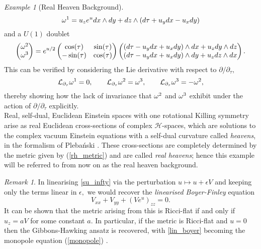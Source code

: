 \documentclass[a4paper,12pt, onecolumn, notitlepage]{article}
\theoremstyle{definition}
\theoremstyle{remark}
\newtheorem{rmk}[thm]{Remark}
\newtheorem{ex}[thm]{Example}
\newcommand{\w}{\omega}
\newcommand{\e}{\epsilon}
\begin{document}
\begin{ex}[Real Heaven Background]
	\begin{equation}
	\label{su_k1}
		\w\indices{^1} = u_{z}e^{u}dx\wedge dy + dz \wedge (d\tau + u_{y}dx - u_{x}dy)
	\end{equation}
	and a $U(1)$ doublet \cite{bakas_1995}
	\begin{equation}
	\label{su_k23}
		\begin{pmatrix}
		\w\indices{^2}\\
		\w\indices{^3}
		\end{pmatrix}
		=
		e^{u/2}
		\begin{pmatrix}
		\cos(\tau) & \sin(\tau) \\
		-\sin(\tau) & \cos(\tau)
		\end{pmatrix}
		\begin{pmatrix}
		(d\tau - u_{y}dx+u_{x}dy)\wedge dx + u_{z}dy\wedge dz\\
		(d\tau - u_{y}dx+u_{x}dy) \wedge dy + u_{z}dz\wedge dx
		\end{pmatrix}.
	\end{equation}
	This can be verified by considering the Lie derivative with respect to $\partial/\partial_{\tau},$
	\begin{equation*}
		\mathcal{L}_{\partial_{\tau}}\w\indices{^1}=0,\qquad \mathcal{L}_{\partial_{\tau}}\w\indices{^2}=\w\indices{^3},\qquad
		\mathcal{L}_{\partial_{\tau}}\w\indices{^3}= -\w\indices{^2},
	\end{equation*}
	thereby showing how the lack of invariance that $\w\indices{^2}$ and $\w\indices{^3}$ exhibit under the action of $\partial/\partial_{\tau}$ explicitly.\\
	Real, self-dual, Euclidean Einstein spaces with one rotational Killing symmetry arise as real Euclidean cross-sections of complex $\mathcal{H}$-spaces, which are solutions to the complex vacuum Einstein equations with a self-dual curvature called \emph{heavens}, in the formalism of Pleba\'nski \cite{plebanski_1975,park_1990}. These cross-sections are completely determined by the metric given by (\ref{rh_metric}) and are called \emph{real heavens}; hence this example will be referred to from now on as the real heaven background.\\
\end{ex}

\begin{rmk}
	In linearising \cref{su_infty} via the perturbation $u\mapsto u + \e V$ and keeping only the terms linear in $\e,$ we would recover the \emph{linearised Boyer-Finley} equation
	\begin{equation}
		\label{lin_boyer}
		V_{xx} + V_{yy} + (Ve^{u})_{zz}=0. 
	\end{equation}
	It can be shown that the metric arising from this is Ricci-flat if and only if $u_{z} = aV$ for some constant $a.$ In particular, if the metric is Ricci-flat and $u=0$ then the Gibbons-Hawking ansatz is recovered, with \cref{lin_boyer} becoming the monopole equation (\ref{monopole}) \cite{lebrun_1991}.
\end{rmk}
\end{document}
